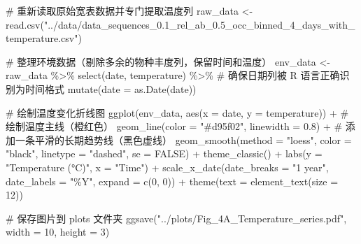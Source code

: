 \documentclass[
  letterpaper,
  DIV=11,
  numbers=noendperiod]{scrreprt}
\newenvironment{Shaded}{\begin{snugshade}}{\end{snugshade}}
\newcommand{\AttributeTok}[1]{\textcolor[rgb]{0.40,0.45,0.13}{#1}}
\newcommand{\CommentTok}[1]{\textcolor[rgb]{0.37,0.37,0.37}{#1}}
\newcommand{\ConstantTok}[1]{\textcolor[rgb]{0.56,0.35,0.01}{#1}}
\newcommand{\DecValTok}[1]{\textcolor[rgb]{0.68,0.00,0.00}{#1}}
\newcommand{\FloatTok}[1]{\textcolor[rgb]{0.68,0.00,0.00}{#1}}
\newcommand{\FunctionTok}[1]{\textcolor[rgb]{0.28,0.35,0.67}{#1}}
\newcommand{\NormalTok}[1]{\textcolor[rgb]{0.00,0.23,0.31}{#1}}
\newcommand{\OtherTok}[1]{\textcolor[rgb]{0.00,0.23,0.31}{#1}}
\newcommand{\SpecialCharTok}[1]{\textcolor[rgb]{0.37,0.37,0.37}{#1}}
\newcommand{\StringTok}[1]{\textcolor[rgb]{0.13,0.47,0.30}{#1}}
\begin{document}
\begin{Shaded}
\begin{Highlighting}[]
\CommentTok{\# 重新读取原始宽表数据并专门提取温度列}
\NormalTok{raw\_data }\OtherTok{\textless{}{-}} \FunctionTok{read.csv}\NormalTok{(}\StringTok{"../data/data\_sequences\_0.1\_rel\_ab\_0.5\_occ\_binned\_4\_days\_with\_temperature.csv"}\NormalTok{)}

\CommentTok{\# 整理环境数据（剔除多余的物种丰度列，保留时间和温度）}
\NormalTok{env\_data }\OtherTok{\textless{}{-}}\NormalTok{ raw\_data }\SpecialCharTok{\%\textgreater{}\%}
  \FunctionTok{select}\NormalTok{(date, temperature) }\SpecialCharTok{\%\textgreater{}\%}
  \CommentTok{\# 确保日期列被 R 语言正确识别为时间格式}
  \FunctionTok{mutate}\NormalTok{(}\AttributeTok{date =} \FunctionTok{as.Date}\NormalTok{(date))}

\CommentTok{\# 绘制温度变化折线图}
\FunctionTok{ggplot}\NormalTok{(env\_data, }\FunctionTok{aes}\NormalTok{(}\AttributeTok{x =}\NormalTok{ date, }\AttributeTok{y =}\NormalTok{ temperature)) }\SpecialCharTok{+}
  \CommentTok{\# 绘制温度主线（橙红色）}
  \FunctionTok{geom\_line}\NormalTok{(}\AttributeTok{color =} \StringTok{"\#d95f02"}\NormalTok{, }\AttributeTok{linewidth =} \FloatTok{0.8}\NormalTok{) }\SpecialCharTok{+}
  \CommentTok{\# 添加一条平滑的长期趋势线（黑色虚线）}
  \FunctionTok{geom\_smooth}\NormalTok{(}\AttributeTok{method =} \StringTok{"loess"}\NormalTok{, }\AttributeTok{color =} \StringTok{"black"}\NormalTok{, }\AttributeTok{linetype =} \StringTok{"dashed"}\NormalTok{, }\AttributeTok{se =} \ConstantTok{FALSE}\NormalTok{) }\SpecialCharTok{+}
  \FunctionTok{theme\_classic}\NormalTok{() }\SpecialCharTok{+}
  \FunctionTok{labs}\NormalTok{(}\AttributeTok{y =} \StringTok{"Temperature (°C)"}\NormalTok{, }\AttributeTok{x =} \StringTok{"Time"}\NormalTok{) }\SpecialCharTok{+}
  \FunctionTok{scale\_x\_date}\NormalTok{(}\AttributeTok{date\_breaks =} \StringTok{"1 year"}\NormalTok{, }\AttributeTok{date\_labels =} \StringTok{"\%Y"}\NormalTok{, }\AttributeTok{expand =} \FunctionTok{c}\NormalTok{(}\DecValTok{0}\NormalTok{, }\DecValTok{0}\NormalTok{)) }\SpecialCharTok{+}
  \FunctionTok{theme}\NormalTok{(}\AttributeTok{text =} \FunctionTok{element\_text}\NormalTok{(}\AttributeTok{size =} \DecValTok{12}\NormalTok{))}

\CommentTok{\# 保存图片到 plots 文件夹}
\FunctionTok{ggsave}\NormalTok{(}\StringTok{"../plots/Fig\_4A\_Temperature\_series.pdf"}\NormalTok{, }\AttributeTok{width =} \DecValTok{10}\NormalTok{, }\AttributeTok{height =} \DecValTok{3}\NormalTok{)}
\end{Highlighting}
\end{Shaded}
\end{document}
